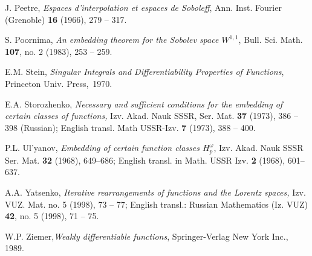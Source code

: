 \documentclass[12pt,twoside,reqno]{amsart}
\numberwithin{equation}{section}
\theoremstyle{definition}
\numberwithin{equation}{section}
\begin{document}
\begin{thebibliography}{99}
 J. Peetre, {\it Espaces d'interpolation et espaces de Soboleff}, Ann. Inst. Fourier
(Grenoble) {\bf 16} (1966), 279 -- 317.

 S.  Poornima, {\it An embedding theorem for the Sobolev space $W^{1,1}$}, Bull. Sci. Math.
{\bf 107}, no. 2 (1983), 253 -- 259.

 E.M. Stein, {\it Singular Integrals and Differentiability Properties of Functions}, Princeton Univ. Press,~1970.

 E.A. Storozhenko, {\it Necessary and sufficient conditions for the embedding of certain classes of functions,} Izv. Akad. Nauk SSSR, Ser. Mat. {\bf 37} (1973), 386 -- 398 (Russian); English transl. Math USSR-Izv. {\bf 7} (1973), 388 -- 400.

 P.L. Ul'yanov, {\it Embedding of certain function classes
$H_p^\omega$}, Izv. Akad. Nauk SSSR Ser. Mat. {\bf 32} (1968),
649--686; English transl. in Math. USSR Izv. {\bf 2} (1968), 601--637.



 A.A. Yatsenko, {\it Iterative rearrangements of
functions and the Lorentz spaces,} Izv. VUZ. Mat. no. 5 (1998), 73
-- 77; English transl.: Russian Mathematics (Iz. VUZ) {\bf 42},
no. 5 (1998), 71 -- 75.

 W.P. Ziemer,{\it Weakly differentiable functions}, Springer-Verlag New York Inc., 1989.

\end{thebibliography}
\end{document}
